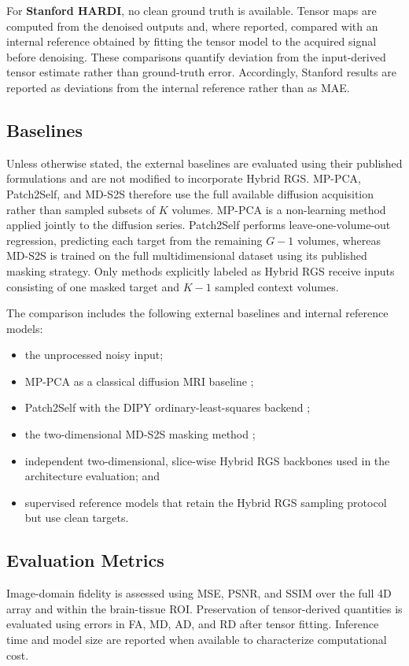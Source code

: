 \documentclass[preprint,12pt]{elsarticle}
\begin{document}
For \textbf{Stanford HARDI}, no clean ground truth is available. Tensor maps are computed from the denoised outputs and, where reported, compared with an internal reference obtained by fitting the tensor model to the acquired signal before denoising. These comparisons quantify deviation from the input-derived tensor estimate rather than ground-truth error. Accordingly, Stanford results are reported as deviations from the internal reference rather than as MAE.

\subsection{Baselines}
Unless otherwise stated, the external baselines are evaluated using their published formulations and are not modified to incorporate Hybrid RGS. MP-PCA, Patch2Self, and MD-S2S therefore use the full available diffusion acquisition rather than sampled subsets of $K$ volumes. MP-PCA is a non-learning method applied jointly to the diffusion series. Patch2Self performs leave-one-volume-out regression, predicting each target from the remaining $G-1$ volumes, whereas MD-S2S is trained on the full multidimensional dataset using its published masking strategy. Only methods explicitly labeled as Hybrid RGS receive inputs consisting of one masked target and $K-1$ sampled context volumes.

The comparison includes the following external baselines and internal reference models:
\begin{itemize}
  \item the unprocessed noisy input;
  \item MP-PCA as a classical diffusion MRI baseline \cite{veraart2016mppca};
  \item Patch2Self with the DIPY ordinary-least-squares backend \cite{fadnavis2020patch2self};
  \item the two-dimensional MD-S2S masking method \cite{kang2024mds2s};
  \item independent two-dimensional, slice-wise Hybrid RGS backbones used in the architecture evaluation; and
  \item supervised reference models that retain the Hybrid RGS sampling protocol but use clean targets.
\end{itemize}

\subsection{Evaluation Metrics}
\label{subsec:metrics}
Image-domain fidelity is assessed using MSE, PSNR, and SSIM over the full 4D array and within the brain-tissue ROI. Preservation of tensor-derived quantities is evaluated using errors in FA, MD, AD, and RD after tensor fitting. Inference time and model size are reported when available to characterize computational cost.
\end{document}
